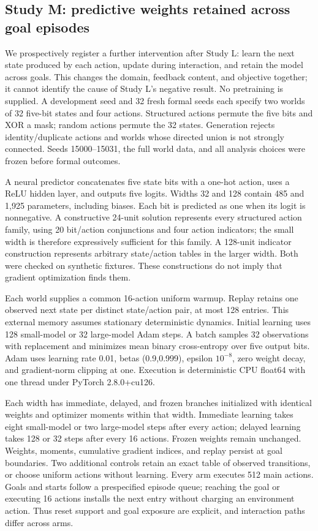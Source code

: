 \documentclass[11pt]{article}
\begin{document}
\subsection{Study M: predictive weights retained across goal episodes}
We prospectively register a further intervention after Study L: learn the next
state produced by each action, update during interaction, and retain the model
across goals. This changes the domain, feedback content, and objective together;
it cannot identify the cause of Study L's negative result. No pretraining is
supplied. A development seed and 32 fresh formal seeds each specify two worlds
of 32 five-bit states and four actions. Structured actions permute the five
bits and XOR a mask; random actions permute the 32 states. Generation rejects
identity/duplicate actions and worlds whose directed union is not strongly
connected. Seeds 15000--15031, the full world data, and all analysis choices
were frozen before formal outcomes.

A neural predictor concatenates five state bits with a one-hot action,
uses a ReLU hidden layer, and outputs five logits. Widths 32 and 128 contain
485 and 1,925 parameters, including biases. Each bit is predicted as one when
its logit is nonnegative. A constructive 24-unit solution represents every
structured action family, using 20 bit/action conjunctions and four action
indicators; the small width is therefore expressively sufficient for this
family. A 128-unit indicator construction represents arbitrary state/action
tables in the larger width. Both were checked on synthetic fixtures.
These constructions do not imply that gradient optimization finds them.

Each world supplies a common 16-action uniform warmup. Replay retains one
observed next state per distinct state/action pair, at most 128 entries.
This external memory assumes stationary deterministic dynamics. Initial
learning uses 128 small-model or 32 large-model Adam steps. A batch samples
32 observations with replacement and minimizes mean binary cross-entropy over
five output bits. Adam uses learning rate 0.01, betas (0.9,0.999), epsilon
$10^{-8}$, zero weight decay, and gradient-norm clipping at one. Execution is
deterministic CPU float64 with one thread under PyTorch 2.8.0+cu126.

Each width has immediate, delayed, and frozen branches initialized with
identical weights and optimizer moments within that width. Immediate learning
takes eight small-model or two large-model steps after every action; delayed
learning takes 128 or 32 steps after every 16 actions. Frozen weights remain
unchanged. Weights, moments, cumulative gradient indices, and replay persist
at goal boundaries. Two additional controls retain an exact table of observed
transitions, or choose uniform actions without learning. Every arm executes
512 main actions. Goals and starts follow a prespecified episode queue;
reaching the goal or executing 16 actions installs the next entry without
charging an environment action. Thus reset support and goal exposure are
explicit, and interaction paths differ across arms.
\end{document}
